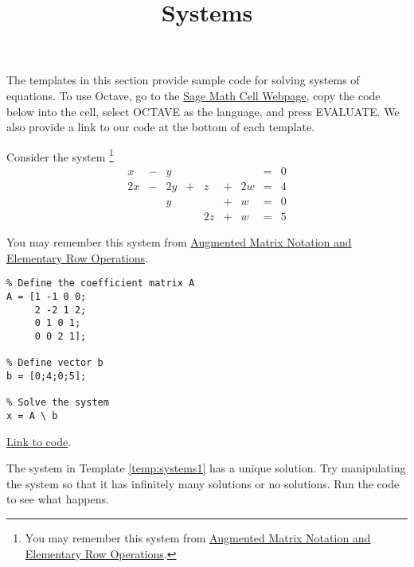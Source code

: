\documentclass{ximera}
\title{Systems} \license{CC BY-NC-SA 4.0}
\begin{document}
\begin{abstract}
\end{abstract}
\maketitle

The templates in this section provide sample code for solving systems of equations.  To use Octave, go to the \href{https://sagecell.sagemath.org/}{Sage Math Cell Webpage}, copy the code below into the cell, select OCTAVE as the language, and press EVALUATE.  We also provide a link to our code at the bottom of each template.

\begin{template}\label{temp:systems1}
Consider the system%
\footnote{You may remember this system from \href{https://ximera.osu.edu/linearalgebrav3/LinearAlgebraInteractiveIntro/SYS-0020/main}{Augmented Matrix Notation and Elementary Row Operations}.  } 
\begin{equation}
\begin{array}{ccccccccc}
      x &- &y&&&&&= &0 \\
	 2x& -&2y&+&z&+&2w&=&4\\
     & &y&&&+&w&=&0\\
     & &&&2z&+&w&=&5
    \end{array}
    \end{equation}

 You may remember this system from \href{https://ximera.osu.edu/linearalgebrav3/LinearAlgebraInteractiveIntro/SYS-0020/main}{Augmented Matrix Notation and Elementary Row Operations}.   
\begin{verbatim}
% Define the coefficient matrix A
A = [1 -1 0 0;
     2 -2 1 2;
     0 1 0 1;
     0 0 2 1];

% Define vector b
b = [0;4;0;5];

% Solve the system 
x = A \ b
\end{verbatim}

\href{https://sagecell.sagemath.org/?z=eJxFjsEKwjAQRO-B_Ye59FjYBD0FDwH_wGP1YMIGA7aBNpT69yZIcG-PeczsgKvEtAjKSxCyxJhCkqVgfpY1HXCkHC6YNEYNBltSaGcwGmiYzowW6z9yVfSjMqmhb-wSSl7hSfnWyfZk2Z67dMvv_ffH9tmKzCB1VM3hDv8FLh8nkA==&lang=octave&interacts=eJyLjgUAARUAuQ==}{Link to code}.

\end{template}

The system in Template \ref{temp:systems1} has a unique solution.  Try manipulating the system so that it has infinitely many solutions or no solutions.  Run the code to see what happens.
  
\end{document}
